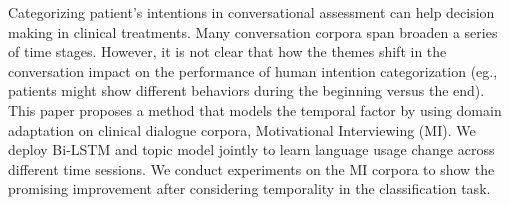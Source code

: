 Categorizing patient's intentions in conversational assessment can help decision making in clinical treatments. Many conversation corpora span broaden a series of time stages. However, it is not clear that how the themes shift in the conversation impact on the performance of human intention categorization (eg., patients might show different behaviors during the beginning versus the end). This paper proposes a method that models the temporal factor by using domain adaptation on clinical dialogue corpora, Motivational Interviewing (MI). We deploy Bi-LSTM and topic model jointly to learn language usage change across different time sessions. We conduct experiments on the MI corpora to show the promising improvement after considering temporality in the classification task.
